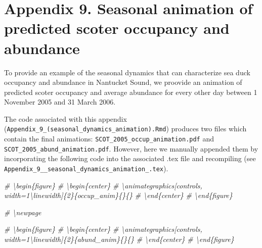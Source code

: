 \documentclass[12pt,]{article}
\title{}
\author{}
\date{}
\newenvironment{Shaded}{\begin{snugshade}}{\end{snugshade}}
\newcommand{\CommentTok}[1]{\textcolor[rgb]{0.56,0.35,0.01}{\textit{{#1}}}}
\begin{document}
\maketitle


\section{Appendix 9. Seasonal animation of predicted scoter occupancy
and
abundance}\label{appendix-9.-seasonal-animation-of-predicted-scoter-occupancy-and-abundance}

To provide an example of the seasonal dynamics that can characterize sea
duck occupancy and abundance in Nantucket Sound, we proovide an
animation of predicted scoter occupancy and average abundance for every
other day between 1 November 2005 and 31 March 2006.

The code associated with this appendix
(\texttt{Appendix\_9\_(seasonal\_dynamics\_animation).Rmd}) produces two
files which contain the final animations:
\texttt{SCOT\_2005\_occup\_animation.pdf} and
\texttt{SCOT\_2005\_abund\_animation.pdf}. However, here we manually
appended them by incorporating the following code into the associated
.tex file and recompiling (see
\texttt{Appendix\_9\_\_seasonal\_dynamics\_animation\_.tex}).

\begin{Shaded}
\begin{Highlighting}[]
\CommentTok{# \textbackslash{}begin\{figure\}}
\CommentTok{# \textbackslash{}begin\{center\}}
\CommentTok{# \textbackslash{}animategraphics[controls, width=1\textbackslash{}linewidth]\{2\}\{occup_anim\}\{\}\{\}}
\CommentTok{# \textbackslash{}end\{center\}}
\CommentTok{# \textbackslash{}end\{figure\}}

\CommentTok{# \textbackslash{}newpage}

\CommentTok{# \textbackslash{}begin\{figure\}}
\CommentTok{# \textbackslash{}begin\{center\}}
\CommentTok{# \textbackslash{}animategraphics[controls, width=1\textbackslash{}linewidth]\{2\}\{abund_anim\}\{\}\{\}}
\CommentTok{# \textbackslash{}end\{center\}}
\CommentTok{# \textbackslash{}end\{figure\}}
\end{Highlighting}
\end{Shaded}

\begin{figure}
\begin{center}
\end{center}
\end{figure}

\newpage

\begin{figure}
\begin{center}
\end{center}
\end{figure}
\end{document}
